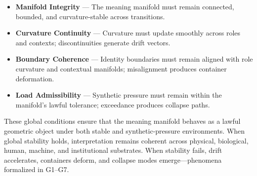 \begin{itemize}[leftmargin=1.2cm]
    \item \textbf{Manifold Integrity} — The meaning manifold must remain
    connected, bounded, and curvature-stable across transitions.

    \item \textbf{Curvature Continuity} — Curvature must update smoothly across
    roles and contexts; discontinuities generate drift vectors.

    \item \textbf{Boundary Coherence} — Identity boundaries must remain aligned
    with role curvature and contextual manifolds; misalignment produces
    container deformation.

    \item \textbf{Load Admissibility} — Synthetic pressure must remain within
    the manifold’s lawful tolerance; exceedance produces collapse paths.
\end{itemize}

\medskip

\noindent These global conditions ensure that the meaning manifold behaves as a
lawful geometric object under both stable and synthetic-pressure environments.
When global stability holds, interpretation remains coherent across physical,
biological, human, machine, and institutional substrates. When stability fails,
drift accelerates, containers deform, and collapse modes emerge—phenomena
formalized in G1--G7.


